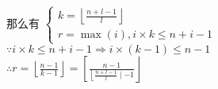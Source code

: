 \documentclass[E:/GsjzTle/main/main.tex]{subfiles}
\begin{document}
\begin{itemize}
  那么有
  \(\left\{\begin{array}{l}k=\left\lfloor\frac{n+l-1}{l}\right\rfloor \\ r=\max (i), i\times k \leq n+i-1 \end{array}\right.\)\\
  \(\because i \times k \le n+i-1 \Rightarrow  i\times(k-1) \le n-1\)\\
  \(\therefore r=\left\lfloor\frac{n-1}{k-1}\right\rfloor=\left[\frac{n-1}{\left\lfloor\frac{n+l-1}{l} \mid-1\right.}\right\rfloor\)
\end{itemize}
\end{document}

